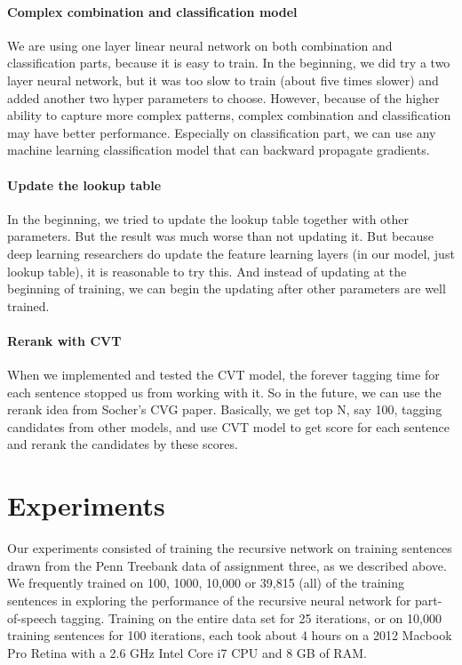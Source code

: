 \documentclass[11pt]{article}
\begin{document}
\paragraph{Complex combination and classification model}
We are using one layer linear neural network on both combination and classification parts, because it is easy to train. In the beginning, we did try a two layer neural network, but it was too slow to train (about five times slower) and added another two hyper parameters to choose. However, because of the higher ability to capture more complex patterns, complex combination and classification may have better performance. Especially on classification part, we can use any machine learning classification model that can backward propagate gradients.

\paragraph{Update the lookup table}
In the beginning, we tried to update the lookup table together with other parameters. But the result was much worse than not updating it. But because deep learning researchers do update the feature learning layers (in our model, just lookup table), it is reasonable to try this. And instead of updating at the beginning of training, we can begin the updating after other parameters are well trained.

\paragraph{Rerank with CVT}
When we implemented and tested the CVT model, the forever tagging time for each sentence stopped us from working with it. So in the future, we can use the rerank idea from Socher's CVG paper. Basically, we get top N, say 100, tagging candidates from other models, and use CVT model to get score for each sentence and rerank the candidates by these scores.

\section{Experiments}

Our experiments consisted of training the recursive network on training sentences drawn from the Penn Treebank data of assignment three, as we described above. We frequently trained on 100, 1000, 10,000 or 39,815 (all) of the training sentences in exploring the performance of the recursive neural network for part-of-speech tagging. Training on the entire data set for 25 iterations, or on 10,000 training sentences for 100 iterations, each took about 4 hours on a 2012 Macbook Pro Retina with a 2.6 GHz Intel Core i7 CPU and 8 GB of RAM.
\end{document}
